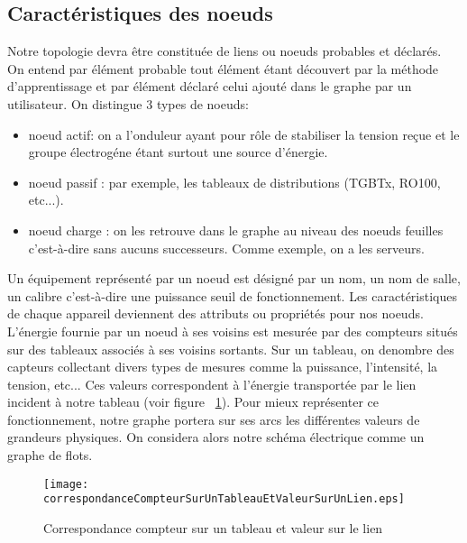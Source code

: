 \documentclass[onecolumn, 12pt]{article}
\begin{document}
\subsection{Caract\'eristiques des noeuds}
Notre topologie devra \^etre constitu\'ee de liens ou noeuds probables et d\'eclar\'es. On entend par \'el\'ement probable tout \'el\'ement \'etant d\'ecouvert par la m\'ethode d'apprentissage et par \'el\'ement d\'eclar\'e celui ajout\'e dans le graphe par un utilisateur.
On distingue 3 types de noeuds:
\begin{itemize}
\item noeud actif: on a l'onduleur ayant pour r\^ole de stabiliser la tension re\c cue et le groupe \'electrog\'ene \'etant surtout une source d'\'energie.
\item noeud passif :  par exemple, les tableaux de distributions (TGBTx, RO100, etc...).
\item noeud charge : on les retrouve dans le graphe au niveau des noeuds feuilles c'est-\`a-dire sans aucuns successeurs. Comme exemple, on a les serveurs.
\end{itemize}
Un \'equipement repr\'esent\'e par un noeud est d\'esign\'e par un nom, un nom de salle, un calibre c'est-\`a-dire  une puissance seuil de fonctionnement. Les caract\'eristiques de chaque appareil deviennent des attributs ou propri\'et\'es pour nos noeuds. \newline
L'\'energie fournie par un noeud \`a ses voisins est mesur\'ee par des compteurs situ\'es sur des tableaux associ\'es \`a ses voisins sortants. Sur un tableau, on denombre des capteurs collectant divers types de mesures comme la puissance, l'intensit\'e, la tension, etc... Ces valeurs correspondent \`a l'\'energie transport\'ee par le lien incident \`a notre tableau (voir figure ~\ref{correspondanceCompteurSurUnTableauEtValeurSurUnLien}). \newline
Pour mieux repr\'esenter ce fonctionnement, notre graphe portera sur ses arcs les diff\'erentes valeurs de grandeurs physiques. On considera  alors notre sch\'ema \'electrique comme un graphe de flots.
\begin{figure}[!h]
\texttt{[image: correspondanceCompteurSurUnTableauEtValeurSurUnLien.eps]}
\caption{Correspondance compteur sur un tableau et valeur sur le lien}
\label{correspondanceCompteurSurUnTableauEtValeurSurUnLien}
 \end{figure}
 
\end{document}

